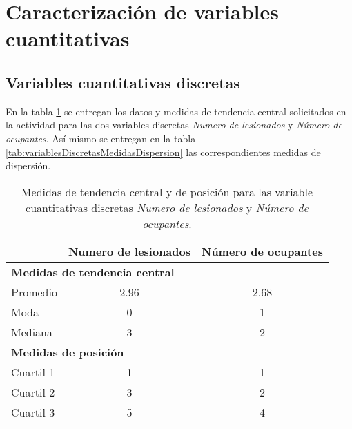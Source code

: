 \section*{Caracterización de variables cuantitativas}
\subsection*{Variables cuantitativas discretas}
En la tabla \ref{tab:variablesDiscretasMedidasCentral} se entregan los datos y medidas de tendencia central solicitados en la actividad para las dos variables discretas \emph{Numero de lesionados} y \emph{Número de ocupantes}. Así mismo se entregan en la tabla \ref{tab:variablesDiscretasMedidasDispersion} las correspondientes medidas de dispersión.
\begin{table}[!htbp]
    \makegapedcells
    \begin{footnotesize}
        \centering
        \begin{tabular}{lc|c}
            \toprule
            {} & \textbf{Numero de lesionados} & \textbf{Número de ocupantes} \\
            \bottomrule
            \toprule
            \multicolumn{3}{l}{\textbf{Medidas de tendencia central}} \\
            \bottomrule
            Promedio & 2.96 & 2.68 \\
            \midrule
            Moda & 0 & 1\\
            \midrule
            Mediana & 3 & 2 \\
            \bottomrule
            \toprule
            \multicolumn{3}{l}{\textbf{Medidas de posición}} \\
            \bottomrule
            Cuartil 1 & 1 & 1 \\
            \midrule
            Cuartil 2 & 3 & 2 \\
            \midrule
            Cuartil 3 & 5 & 4 \\
            \bottomrule
        \end{tabular}
        \caption{\footnotesize{Medidas de tendencia central y de posición para las variable cuantitativas discretas  \emph{Numero de lesionados} y \emph{Número de ocupantes}.}}
        \label{tab:variablesDiscretasMedidasCentral}
    \end{footnotesize}
\end{table}
